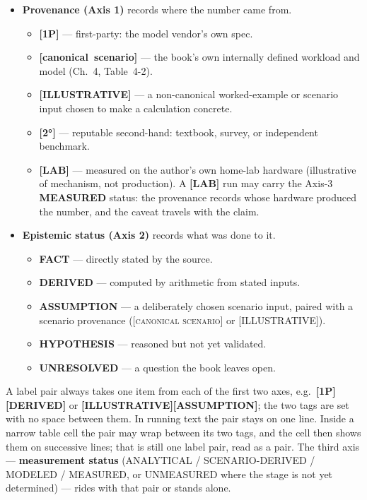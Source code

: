 \begin{itemize}
  \item \textbf{Provenance (Axis 1)} records where the number came from.
  \begin{itemize}
    \item \textbf{[1P]} --- first-party: the model vendor's own spec.
    \item \textbf{\mbox{[canonical scenario]}} --- the book's own internally
    defined workload and model (Ch.~4, Table~4-2).
    \item \textbf{[ILLUSTRATIVE]} --- a non-canonical worked-example or
    scenario input chosen to make a calculation concrete.
    \item \textbf{[2°]} --- reputable second-hand: textbook, survey, or
    independent benchmark.
    \item \textbf{[LAB]} --- measured on the author's own home-lab hardware
    (illustrative of mechanism, not production). A \textbf{[LAB]} run may
    carry the Axis-3 \textbf{MEASURED} status: the provenance records whose
    hardware produced the number, and the caveat travels with the claim.
  \end{itemize}
  \item \textbf{Epistemic status (Axis 2)} records what was done to it.
  \begin{itemize}
    \item \textbf{FACT} --- directly stated by the source.
    \item \textbf{DERIVED} --- computed by arithmetic from stated inputs.
    \item \textbf{ASSUMPTION} --- a deliberately chosen scenario input, paired
    with a scenario provenance (\textsc{[canonical scenario]} or
    \textsc{[ILLUSTRATIVE]}).
    \item \textbf{HYPOTHESIS} --- reasoned but not yet validated.
    \item \textbf{UNRESOLVED} --- a question the book leaves open.
  \end{itemize}
\end{itemize}

A label pair always takes one item from each of the first two axes, e.g.\ \textbf{[1P][DERIVED]} or \textbf{[ILLUSTRATIVE][ASSUMPTION]}; the two tags
are set with no space between them. In running text the pair stays on one
line. Inside a narrow table cell the pair may wrap between its two tags, and
the cell then shows them on successive lines; that is still one label pair,
read as a pair. The third
axis --- \textbf{measurement status} (ANALYTICAL / SCENARIO-DERIVED / MODELED
/ MEASURED, or UNMEASURED where the stage is not yet determined) --- rides
with that pair or stands alone.

